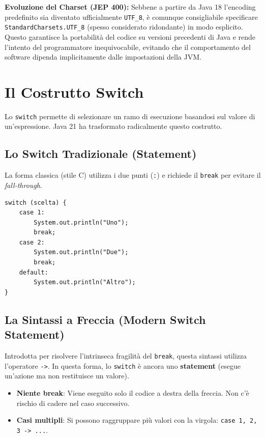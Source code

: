 \begin{warningbox}[]
    \textbf{Evoluzione del Charset (JEP 400):} Sebbene a partire da Java 18 l'encoding predefinito sia diventato ufficialmente \texttt{UTF\_8}, è comunque consigliabile specificare \texttt{StandardCharsets.UTF\_8} (spesso considerato ridondante) in modo esplicito. Questo garantisce la portabilità del codice su versioni precedenti di Java e rende l'intento del programmatore inequivocabile, evitando che il comportamento del software dipenda implicitamente dalle impostazioni della JVM.
\end{warningbox}

\section{Il Costrutto Switch}

Lo \texttt{switch} permette di selezionare un ramo di esecuzione basandosi sul valore di un'espressione. Java 21 ha trasformato radicalmente questo costrutto.

\subsection{Lo Switch Tradizionale (Statement)}
La forma classica (stile C) utilizza i due punti (\texttt{:}) e richiede il \texttt{break} per evitare il \textit{fall-through}.

\begin{lstlisting}[caption={Switch tradizionale}]
switch (scelta) {
    case 1:
        System.out.println("Uno");
        break; 
    case 2:
        System.out.println("Due");
        break;
    default:
        System.out.println("Altro");
}
\end{lstlisting}

\subsection{La Sintassi a Freccia (Modern Switch Statement)}
Introdotta per risolvere l'intrinseca fragilità del \texttt{break}, questa sintassi utilizza l'operatore \texttt{->}. In questa forma, lo \texttt{switch} è ancora uno \textbf{statement} (esegue un'azione ma non restituisce un valore).

\begin{itemize}
    \item \textbf{Niente break}: Viene eseguito solo il codice a destra della freccia. Non c'è rischio di cadere nel caso successivo.
    \item \textbf{Casi multipli}: Si possono raggruppare più valori con la virgola: \texttt{case 1, 2, 3 -> ...}.
\end{itemize}

